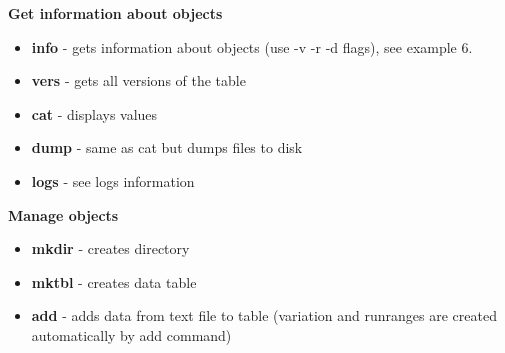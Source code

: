 \documentclass{article}
\begin{document}
\textbf{Get information about objects}
\begin{itemize}
  \item \textbf{info} - gets information about objects (use -v -r -d flags), see example 6.
  \item \textbf{vers} - gets all versions of the table
  \item \textbf{cat}  - displays values
  \item \textbf{dump} - same as cat but dumps files to disk
  \item \textbf{logs} - see logs information
\end{itemize}


\textbf{Manage objects}
\begin{itemize}
  \item \textbf{mkdir} - creates directory
  \item \textbf{mktbl} - creates data table
  \item \textbf{add} - adds data from text file to table
        (variation and runranges are created automatically by add command)
\end{itemize}






\end{document}
